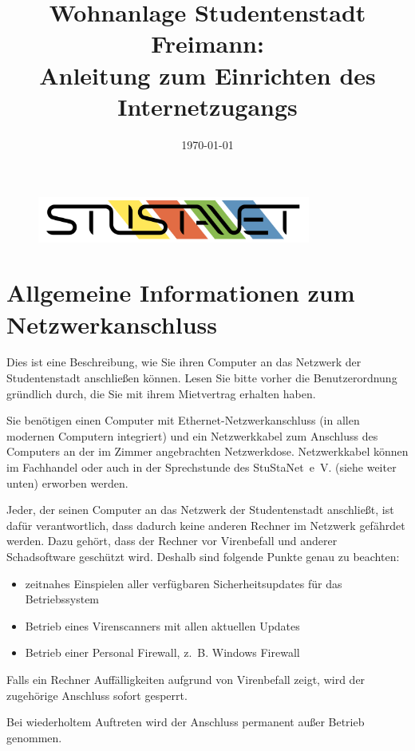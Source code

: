 \documentclass[a4paper,12pt]{scrartcl}
\title{Wohnanlage Studentenstadt Freimann:\\
       Anleitung zum Einrichten des Internetzugangs}
\date{\today}
\begin{document}
\maketitle

\begin{figure}[t!]
   \centering
   \vspace{-20pt}
   \includegraphics[width=0.8\textwidth,keepaspectratio]{Bilder/StuStaNet_Logo}
   \vspace{-20pt}
\end{figure}

\section*{Allgemeine Informationen zum Netzwerkanschluss}

Dies ist eine Beschreibung, wie Sie ihren Computer an das Netzwerk der Studentenstadt anschließen können. Lesen Sie bitte vorher die Benutzerordnung gründlich durch, die Sie mit ihrem Mietvertrag erhalten haben.

Sie benötigen einen Computer mit Ethernet-Netzwerkanschluss (in allen modernen Computern integriert) und ein Netzwerkkabel zum Anschluss des Computers an der im Zimmer angebrachten Netzwerkdose. Netzwerkkabel können im Fachhandel oder auch in der Sprechstunde des StuStaNet~e~V. (siehe weiter unten) erworben werden.

Jeder, der seinen Computer an das Netzwerk der Studentenstadt anschließt, ist dafür verantwortlich, dass dadurch keine anderen Rechner im Netzwerk gefährdet werden. Dazu gehört, dass der Rechner vor Virenbefall und anderer Schadsoftware geschützt wird. Deshalb sind folgende Punkte genau zu beachten:
\begin{itemize}
    \item zeitnahes Einspielen aller verfügbaren Sicherheitsupdates für das Betriebssystem
    \item Betrieb eines Virenscanners mit allen aktuellen Updates
    \item Betrieb einer Personal Firewall, z.~B. Windows Firewall
\end{itemize}
Falls ein Rechner Auffälligkeiten aufgrund von Virenbefall zeigt, wird der zugehörige Anschluss sofort gesperrt.

\begin{em}
Bei wiederholtem Auftreten wird der Anschluss permanent außer Betrieb genommen.
\end{em}
\end{document}
